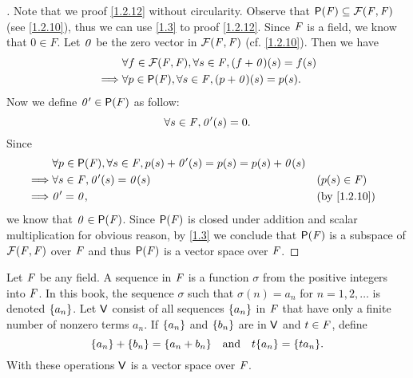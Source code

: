 \begin{proof}[]
	Note that we proof \cref{1.2.12} without circularity.
	Observe that \(\ps{\F} \subseteq \fs{\F}{\F}\) (see \cref{1.2.10}), thus we can use \cref{1.3} to proof \cref{1.2.12}.
	Since \(\mathit{F}\) is a field, we know that \(0 \in F\).
	Let \(\mathit{0}\) be the zero vector in \(\fs{\F}{\F}\) (cf. \cref{1.2.10}).
	Then we have
	\begin{align*}
		         & \forall f \in \fs{\F}{\F}, \forall s \in \F, (f + \zv)(s) = f(s) \\
		\implies & \forall p \in \ps{\F}, \forall s \in \F, (p + \zv)(s) = p(s).
	\end{align*}
	Now we define \(\zv' \in \ps{F}\) as follow:
	\[
		\forall s \in \mathit{F}, \mathit{0}'(s) = 0.
	\]
	Since
	\begin{align*}
		         & \forall p \in \ps{\F}, \forall s \in \F, p(s) + \zv'(s) = p(s) = p(s) + \zv(s)                                \\
		\implies & \forall s \in \F, \zv'(s) = \zv(s)                                             &  & (p(s) \in \F)             \\
		\implies & \zv' = \zv,                                                                    &  & \text{(by \cref{1.2.10})}
	\end{align*}
	we know that \(\zv \in \ps{\F}\).
	Since \(\ps{\F}\) is closed under addition and scalar multiplication for obvious reason, by \cref{1.3} we conclude that \(\ps{\F}\) is a subspace of \(\fs{\F}{\F}\) over \(\mathit{F}\) and thus \(\ps{\F}\) is a vector space over \(\mathit{F}\).
\end{proof}

\begin{eg}\label{1.2.13}
	Let \(\mathit{F}\) be any field.
	A sequence in \(\mathit{F}\) is a function \(\sigma\) from the positive integers into \(\mathit{F}\).
	In this book, the sequence \(\sigma\) such that \(\sigma(n) = a_n\) for \(n = 1, 2, \dots\) is denoted \(\left\lbrace a_n\right\rbrace\).
	Let \(\mathsf{V}\) consist of all sequences \(\left\lbrace a_n\right\rbrace\) in \(\mathit{F}\) that have only a finite number of nonzero terms \(a_n\).
	If \(\left\lbrace a_n\right\rbrace\) and \(\left\lbrace b_n\right\rbrace\) are in \(\mathsf{V}\) and \(t \in \mathit{F}\), define
	\[
		\set{a_n} + \set{b_n} = \set{a_n + b_n} \quad \text{and} \quad t\set{a_n} = \set{ta_n}.
	\]
	With these operations \(\mathsf{V}\) is a vector space over \(\mathit{F}\).
\end{eg}

